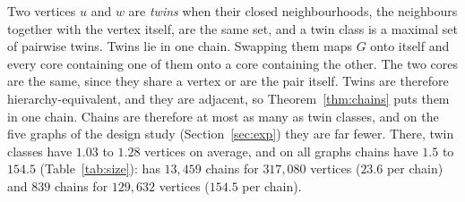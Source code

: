 Two vertices $u$ and $w$ are \textit{twins} when their closed neighbourhoods, the neighbours together with the vertex itself, are the same set, and a twin class is a maximal set of pairwise twins.
%
Twins lie in one chain.
%
Swapping them maps $G$ onto itself and every core containing one of them onto a core containing the other.
%
The two cores are the same, since they share a vertex or are the pair itself.
%
Twins are therefore hierarchy-equivalent, and they are adjacent, so Theorem~\ref{thm:chains} puts them in one chain.
%
Chains are therefore at most as many as twin classes, and on the five graphs of the design study (Section~\ref{sec:exp}) they are far fewer.
%
There, twin classes have $1.03$ to $1.28$ vertices on average, and on all graphs chains have $1.5$ to $154.5$ (Table~\ref{tab:size}): \dblp has $13{,}459$ chains for $317{,}080$ vertices ($23.6$ per chain) and \webuk $839$ chains for $129{,}632$ vertices ($154.5$ per chain).

